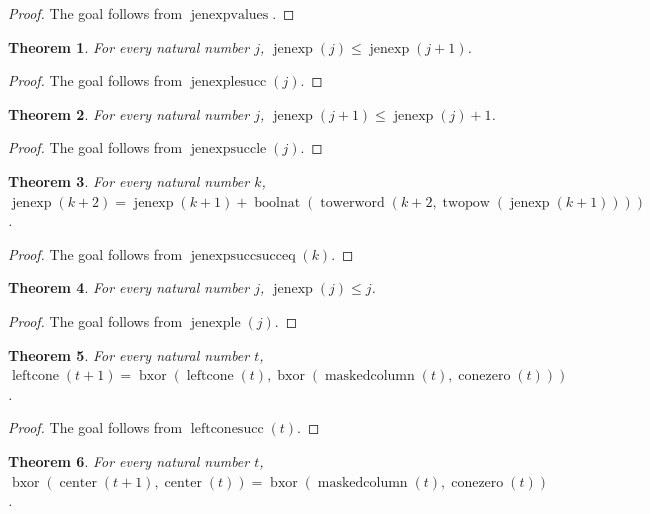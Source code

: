 \documentclass[11pt]{article}
\newtheorem{theorem}{Theorem}[section]
\theoremstyle{definition}
\begin{document}
\begin{proof}
The goal follows from \(\operatorname{jenexpvalues}\).
\end{proof}
\begin{theorem}
\label{ll:observations:jen-exp-le-succ}
For every natural number \(j\), \(\operatorname{jenexp}(j) \le \operatorname{jenexp}(j + 1)\).
\end{theorem}
\begin{proof}
The goal follows from \(\operatorname{jenexplesucc}(j)\).
\end{proof}
\begin{theorem}
\label{ll:observations:jen-exp-succ-le}
For every natural number \(j\), \(\operatorname{jenexp}(j + 1) \le \operatorname{jenexp}(j) + 1\).
\end{theorem}
\begin{proof}
The goal follows from \(\operatorname{jenexpsuccle}(j)\).
\end{proof}
\begin{theorem}
\label{ll:observations:jen-exp-succ-succ-eq}
For every natural number \(k\), \(\operatorname{jenexp}(k + 2) = \operatorname{jenexp}(k + 1) + \operatorname{boolnat}(\operatorname{towerword}(k + 2, \operatorname{twopow}(\operatorname{jenexp}(k + 1))))\).
\end{theorem}
\begin{proof}
The goal follows from \(\operatorname{jenexpsuccsucceq}(k)\).
\end{proof}
\begin{theorem}
\label{ll:observations:jen-exp-le}
For every natural number \(j\), \(\operatorname{jenexp}(j) \le j\).
\end{theorem}
\begin{proof}
The goal follows from \(\operatorname{jenexple}(j)\).
\end{proof}
\begin{theorem}
\label{ll:observations:left-cone-succ}
For every natural number \(t\), \(\operatorname{leftcone}(t + 1) = \operatorname{bxor}(\operatorname{leftcone}(t), \operatorname{bxor}(\operatorname{maskedcolumn}(t), \operatorname{conezero}(t)))\).
\end{theorem}
\begin{proof}
The goal follows from \(\operatorname{leftconesucc}(t)\).
\end{proof}
\begin{theorem}
\label{ll:observations:center-increment-all}
For every natural number \(t\), \(\operatorname{bxor}(\operatorname{center}(t + 1), \operatorname{center}(t)) = \operatorname{bxor}(\operatorname{maskedcolumn}(t), \operatorname{conezero}(t))\).
\end{theorem}
\end{document}
